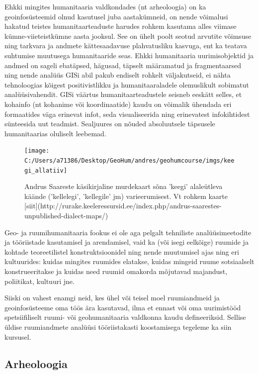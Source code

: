 \documentclass[
]{book}
\begin{document}
Ehkki mingites humanitaaria valdkondades (nt arheoloogia) on ka geoinfosüsteemid olnud kasutusel juba aastakümneid, on nende võimalusi hakatud teistes humanitaarteaduste harudes rohkem kasutama alles viimase kümne-viieteistkümne aasta jooksul. See on ühelt poolt seotud arvutite võimsuse ning tarkvara ja andmete kättesaadavuse plahvatusliku kasvuga, ent ka teatava suhtumise muutusega humanitaaride seas. Ehkki humanitaaria uurimisobjektid ja andmed on sageli ebatäpsed, hägusad, täpselt määramatud ja fragmentaarsed ning nende analüüs GISi abil pakub endiselt rohkelt väljakutseid, ei nähta tehnoloogias kõigest positivistlikku ja humanitaaraladele olemuslikult sobimatut analüüsivahendit. GISi väärtus humanitaarteadustele seisneb eeskätt selles, et kohainfo (nt kohanime või koordinaatide) kaudu on võimalik ühendada eri formaatides väga erinevat infot, seda visualiseerida ning erinevatest infokihtidest sünteesida uut teadmist. Sealjuures on nõuded absoluutsele täpsusele humanitaarias oluliselt leebemad.

\begin{figure}

{\centering \texttt{[image: C:/Users/a71386/Desktop/GeoHum/andres/geohumcourse/imgs/keegi\_allatiiv]} 

}

\caption{Andrus Saareste käsikirjaline murdekaart sõna 'keegi' alaleütleva käände ('kellelegi', 'kellegile' jm) varieerumisest. Vt rohkem kaarte [siit](http://rurake.keeleressursid.ee/index.php/andrus-saarestes-unpublished-dialect-maps/)}\label{fig:murdekaart}
\end{figure}

Geo- ja ruumihumanitaaria fookus ei ole aga pelgalt tehniliste analüüsimeetodite ja tööriistade kasutamisel ja arendamisel, vaid ka (või isegi eelkõige) ruumide ja kohtade teoreetilistel konstruktsioonidel ning nende muutumisel ajas ning eri kultuurides: kuidas mingites ruumides elatakse, kuidas mingeid ruume sotsiaalselt konstrueeritakse ja kuidas need ruumid omakorda mõjutavad majandust, poliitikat, kultuuri jne.

Siiski on vahest enamgi neid, kes ühel või teisel moel ruumiandmeid ja geoinfosüsteeme oma töös ära kasutavad, ilma et ennast või oma uurimistööd spetsiifiliselt ruumi- või geohumanitaaria valdkonna kaudu defineeriksid. Sellise üldise ruumiandmete analüüsi tööriistakasti koostamisega tegeleme ka siin kursusel.

\hypertarget{arheoloogia}{%
\subsection{Arheoloogia}\label{arheoloogia}}
\end{document}
